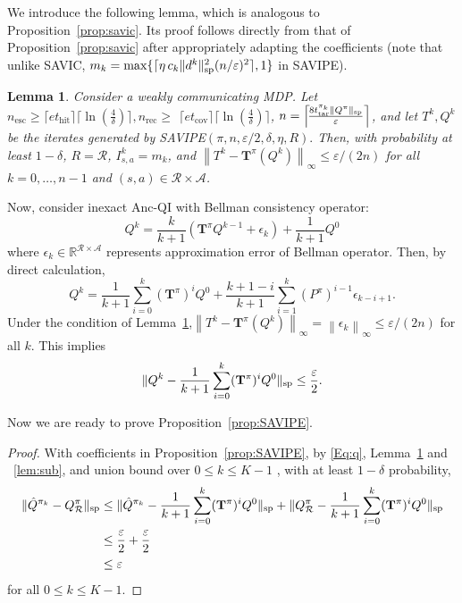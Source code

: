\documentclass{article}
\newtheorem{lemma}[theorem]{Lemma}
\theoremstyle{definition}
\theoremstyle{remark}
\newcommand{\real}{\mathbb{R}}
\newcommand{\cA}{\mathcal{A}}
\newcommand{\cR}{\mathcal{R}}
\newcommand{\T}{\mathbf{T}}
\newcommand*{\infn}[1]{\left\|{#1}\right\|_{\infty}}
\renewcommand{\sp}[1]{\|{#1}\|_\text{\rm sp}}
\begin{document}
We introduce the following lemma, which is analogous to Proposition~\ref{prop:savic}. Its proof follows directly from that of Proposition~\ref{prop:savic} after appropriately adapting the coefficients (note that unlike SAVIC, $m_k= \max\{\lceil \eta\,c_k\sp{d^k}^2(n/\varepsilon)^{2}\rceil,1\}$ in SAVIPE).

\begin{lemma}\label{lem:err}
Consider a weakly communicating MDP. Let $n_{\mathrm{esc}} \ge\lceil e t_{\mathrm{hit}}\rceil \lceil\ln (\frac{4}{\delta})\rceil, n_{\mathrm{rec}}\ge$
$ \lceil  e t_{\mathrm{cov}}\rceil \lceil \ln (\frac{4}{\delta})\rceil$, $n=\left\lceil\!\frac{8 t^{\pi_k}_{\mathrm{tar}}\sp{Q^\pi}}{\varepsilon}\right\rceil$,
and let $T^k, Q^k$ be the iterates generated by 
{\sc \mbox{SAVIPE}}$( \pi, n,  \varepsilon/2,\delta, \eta, R).$
Then, with probability at least $1-\delta$, $R=\cR$, $I^k_{s,a}=m_k$, and $
\infn{T^k-\T^\pi(Q^k) } \le  \varepsilon/(2n) $
for all $k=0,\ldots,n-1$ and $(s,a) \in \cR \times \cA$. 
\end{lemma}

Now, consider inexact Anc-QI with Bellman consistency operator:  
\[Q^k = \frac{k}{k+1}(\T^\pi Q^{k-1}+\epsilon_k) + \frac{1}{k+1}Q^0\]
where $\epsilon_k \in \real^{\cR\times \cA}$ represents approximation error of Bellman operator. Then, by direct calculation, 
\[Q^k=\frac{1}{k+1}\sum^k_{i=0}(\T^\pi)^i Q^0+\frac{k+1-i}{k+1}\sum^k_{i=1}(P^\pi)^{i-1}\epsilon_{k-i+1}.\]
Under the condition of Lemma~\ref{lem:err},$\infn{T^k-\T^\pi(Q^{k})} =\infn{\epsilon_k}\le \varepsilon/(2n)$ for all $k$. This implies 
\begin{equation}\label{Eq:q}
\sp{Q^k-\frac{1}{k+1}\sum^k_{i=0}(\T^\pi)^i Q^0}\le  \frac{\varepsilon}{2}.
\end{equation}

Now we are ready to prove Proposition~\ref{prop:SAVIPE}. 

\begin{proof}
With coefficients in Proposition~\ref{prop:SAVIPE}, by \eqref{Eq:q}, Lemma~\ref{lem:err} and ~\ref{lem:sub}, and union bound over $0 \le k \le K-1$ ,  with at least $1-\delta$ probability,
\begin{align*}
    \sp{\hat{Q}^{\pi_k}-Q_\cR^\pi} &\le \sp{\hat{Q}^{\pi_k}-\frac{1}{k+1}\sum^k_{i=0}(\T^\pi)^i Q^0}+ \sp{Q_\cR^\pi-\frac{1}{k+1}\sum^k_{i=0}(\T^\pi)^i Q^0}
    \\ &\le \frac{\varepsilon}{2}+\frac{\varepsilon}{2}
    \\ &\le \varepsilon
\end{align*}
for all $0 \le k \le K-1$.
\end{proof}
\end{document}
